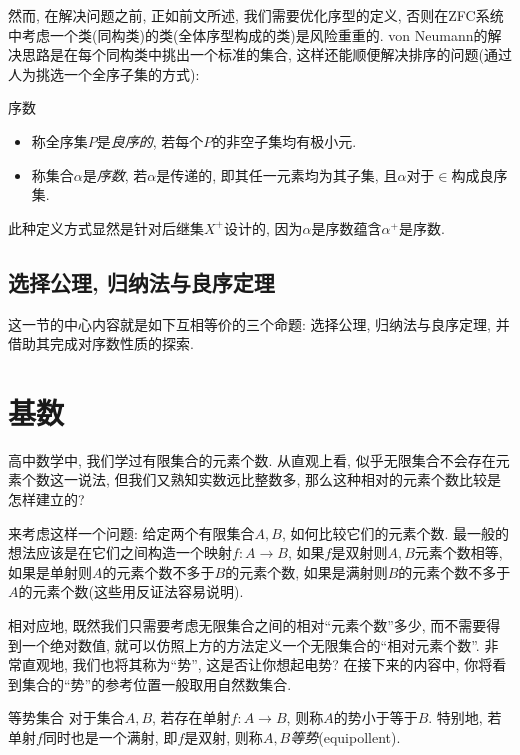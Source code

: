 然而, 在解决问题之前, 正如前文所述, 我们需要优化序型的定义, 否则在ZFC系统中考虑一个类(同构类)的类(全体序型构成的类)是风险重重的. von Neumann的解决思路是在每个同构类中挑出一个标准的集合, 这样还能顺便解决排序的问题(通过人为挑选一个全序子集的方式): 

\begin{definition}{序数}
	\vspace{-2em}
	\begin{itemize}
		\item 称全序集$P$是\textit{良序的}, 若每个$P$的非空子集均有极小元. 
		\item 称集合$\alpha$是\textit{序数}, 若$\alpha$是传递的, 即其任一元素均为其子集, 且$\alpha$对于$\in$构成良序集. 
	\end{itemize}
\end{definition}

此种定义方式显然是针对后继集$X^+$设计的, 因为$\alpha$是序数蕴含$\alpha ^+$是序数. 

\subsection{选择公理, 归纳法与良序定理}

这一节的中心内容就是如下互相等价的三个命题: 选择公理, 归纳法与良序定理, 并借助其完成对序数性质的探索. 


\section{基数}

高中数学中, 我们学过有限集合的元素个数. 从直观上看, 似乎无限集合不会存在元素个数这一说法, 但我们又熟知实数远比整数多, 那么这种相对的元素个数比较是怎样建立的? 

来考虑这样一个问题: 给定两个有限集合$A, B$, 如何比较它们的元素个数. 最一般的想法应该是在它们之间构造一个映射$f: A \to B$, 如果$f$是双射则$A, B$元素个数相等, 如果是单射则$A$的元素个数不多于$B$的元素个数, 如果是满射则$B$的元素个数不多于$A$的元素个数(这些用反证法容易说明). 

相对应地, 既然我们只需要考虑无限集合之间的相对“元素个数”多少, 而不需要得到一个绝对数值, 就可以仿照上方的方法定义一个无限集合的“相对元素个数”. 非常直观地, 我们也将其称为“势”, 这是否让你想起电势? 在接下来的内容中, 你将看到集合的“势”的参考位置一般取用自然数集合. 

\begin{definition}{等势集合}
	对于集合$A, B$, 若存在单射$f: A \to B$, 则称$A$的势小于等于$B$. 特别地, 若单射$f$同时也是一个满射, 即$f$是双射, 则称$A, B$\textit{等势}(equipollent). 
\end{definition}

